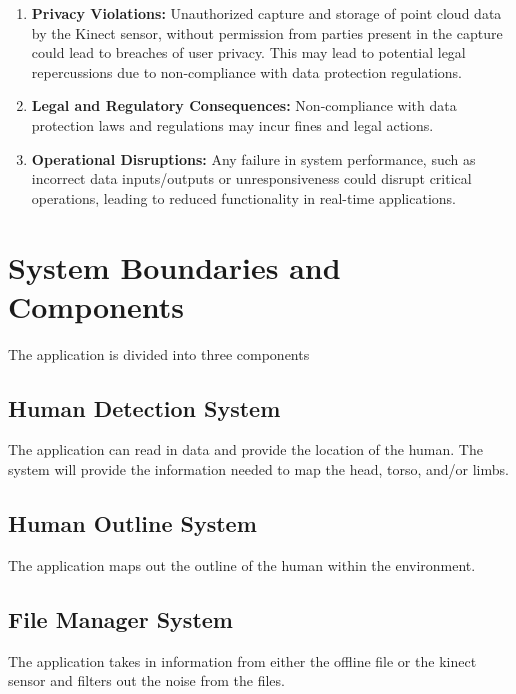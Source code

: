 \documentclass{article}
\begin{document}
\begin{enumerate}

\item \textbf{Privacy Violations:} Unauthorized capture and storage of point cloud data by the Kinect sensor, 
without permission from parties present in the capture could lead to breaches of user privacy. 
This may lead to potential legal repercussions due to non-compliance with data protection regulations.

\item \textbf{Legal and Regulatory Consequences:} Non-compliance with data protection laws and regulations may incur fines and legal actions.


\item \textbf{Operational Disruptions:} Any failure in system performance, such as incorrect data 
inputs/outputs or unresponsiveness could disrupt critical operations, leading to reduced functionality in 
real-time applications.

\end{enumerate}

\section{System Boundaries and Components}


The application is divided into three components
\subsection{Human Detection System}
The application can read in data and provide the location of the human.
The system will provide the information needed to map the head, torso, and/or limbs.
\subsection{Human Outline System}
The application maps out the outline of the human within the environment.
\subsection{File Manager System}
The application takes in information from either the offline file or the kinect sensor and filters out the noise from the files.
\end{document}
